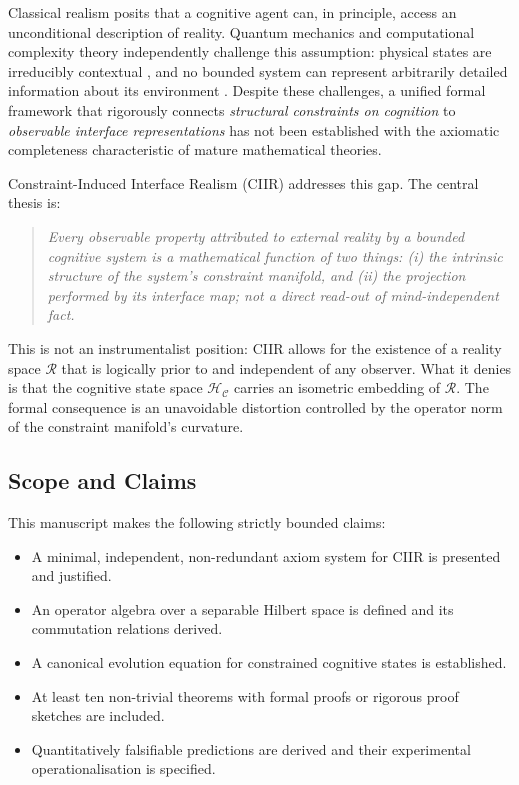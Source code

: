 \documentclass[twocolumn,aps,prd,superscriptaddress,nofootinbib]{revtex4-2}
\newcommand{\HC}{\mathcal{H}_{\mathcal{C}}}
\newcommand{\CR}{\mathcal{R}}
\begin{document}
Classical realism posits that a cognitive agent can, in principle, access an
unconditional description of reality.  Quantum mechanics and computational
complexity theory independently challenge this assumption: physical states are
irreducibly contextual \cite{Kochen1967,Bell1966}, and no bounded system can
represent arbitrarily detailed information about its environment
\cite{Zurek2003,Lloyd2002}.  Despite these challenges, a unified formal
framework that rigorously connects \emph{structural constraints on cognition}
to \emph{observable interface representations} has not been established with
the axiomatic completeness characteristic of mature mathematical theories.

Constraint-Induced Interface Realism (CIIR) addresses this gap.  The central
thesis is:

\begin{quote}
\textit{Every observable property attributed to external reality by a bounded
cognitive system is a mathematical function of two things: (i) the intrinsic
structure of the system's constraint manifold, and (ii) the projection
performed by its interface map; not a direct read-out of mind-independent fact.}
\end{quote}

This is not an instrumentalist position: CIIR allows for the existence of a
reality space $\CR$ that is logically prior to and independent of any observer.
What it denies is that the cognitive state space $\HC$ carries an isometric
embedding of $\CR$.  The formal consequence is an unavoidable distortion
controlled by the operator norm of the constraint manifold's curvature.

\subsection{Scope and Claims}

This manuscript makes the following strictly bounded claims:
\begin{itemize}
    \item A minimal, independent, non-redundant axiom system for CIIR is
          presented and justified.
    \item An operator algebra over a separable Hilbert space is defined and
          its commutation relations derived.
    \item A canonical evolution equation for constrained cognitive states is
          established.
    \item At least ten non-trivial theorems with formal proofs or rigorous
          proof sketches are included.
    \item Quantitatively falsifiable predictions are derived and their
          experimental operationalisation is specified.
\end{itemize}
\end{document}
